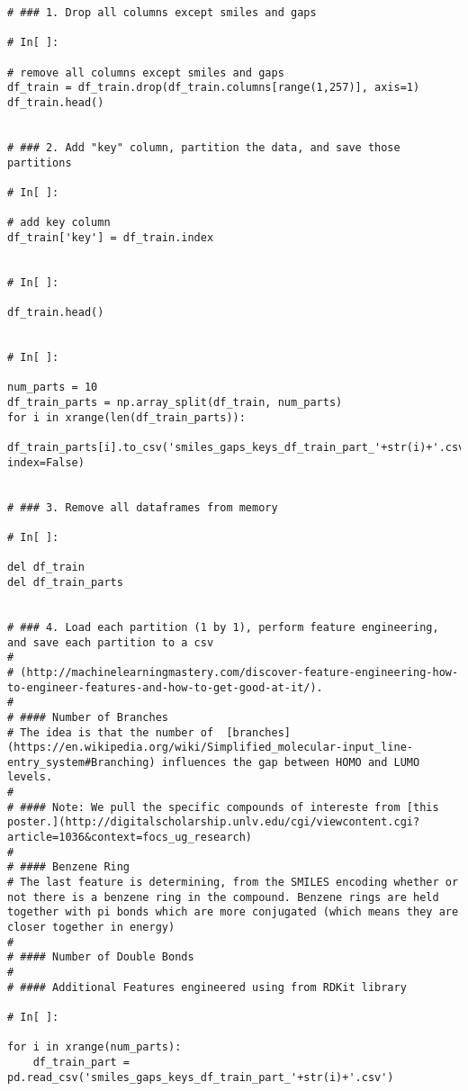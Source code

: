 \documentclass[11pt, oneside]{article}   	%
\begin{document}
\begin{lstlisting}
# ### 1. Drop all columns except smiles and gaps

# In[ ]:

# remove all columns except smiles and gaps
df_train = df_train.drop(df_train.columns[range(1,257)], axis=1)
df_train.head()


# ### 2. Add "key" column, partition the data, and save those partitions

# In[ ]:

# add key column
df_train['key'] = df_train.index


# In[ ]:

df_train.head()


# In[ ]:

num_parts = 10
df_train_parts = np.array_split(df_train, num_parts)
for i in xrange(len(df_train_parts)):
    df_train_parts[i].to_csv('smiles_gaps_keys_df_train_part_'+str(i)+'.csv', index=False)


# ### 3. Remove all dataframes from memory

# In[ ]:

del df_train
del df_train_parts


# ### 4. Load each partition (1 by 1), perform feature engineering, and save each partition to a csv
# 
# (http://machinelearningmastery.com/discover-feature-engineering-how-to-engineer-features-and-how-to-get-good-at-it/). 
# 
# #### Number of Branches
# The idea is that the number of  [branches](https://en.wikipedia.org/wiki/Simplified_molecular-input_line-entry_system#Branching) influences the gap between HOMO and LUMO levels.
# 
# #### Note: We pull the specific compounds of intereste from [this poster.](http://digitalscholarship.unlv.edu/cgi/viewcontent.cgi?article=1036&context=focs_ug_research)
# 
# #### Benzene Ring
# The last feature is determining, from the SMILES encoding whether or not there is a benzene ring in the compound. Benzene rings are held together with pi bonds which are more conjugated (which means they are closer together in energy)
# 
# #### Number of Double Bonds
# 
# #### Additional Features engineered using from RDKit library

# In[ ]:

for i in xrange(num_parts):
    df_train_part = pd.read_csv('smiles_gaps_keys_df_train_part_'+str(i)+'.csv')
    

\end{lstlisting}
\end{document}
